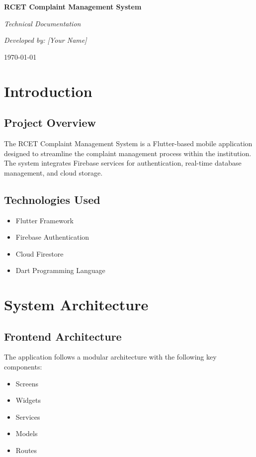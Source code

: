 \documentclass[12pt,a4paper]{article}
\begin{document}
\begin{titlepage}
    \centering
    \vspace*{2cm}
    {\huge\bfseries RCET Complaint Management System\par}
    \vspace{1cm}
    {\Large\itshape Technical Documentation\par}
    \vspace{2cm}
    {\Large\itshape Developed by: [Your Name]\par}
    \vfill
    {\large \today\par}
\end{titlepage}

\tableofcontents
\newpage

\section{Introduction}
\subsection{Project Overview}
The RCET Complaint Management System is a Flutter-based mobile application designed to streamline the complaint management process within the institution. The system integrates Firebase services for authentication, real-time database management, and cloud storage.

\subsection{Technologies Used}
\begin{itemize}
    \item Flutter Framework
    \item Firebase Authentication
    \item Cloud Firestore
    \item Dart Programming Language
\end{itemize}

\section{System Architecture}
\subsection{Frontend Architecture}
The application follows a modular architecture with the following key components:
\begin{itemize}
    \item Screens
    \item Widgets
    \item Services
    \item Models
    \item Routes
\end{itemize}
\end{document}
